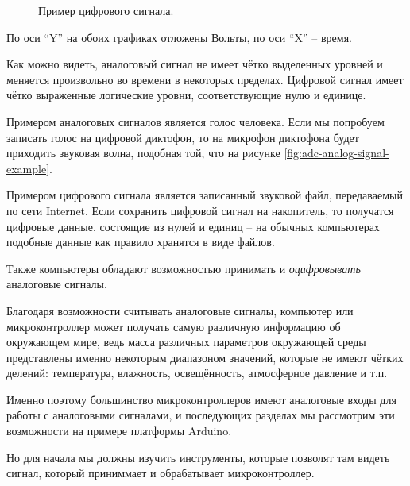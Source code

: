 \documentclass[a4paper,twoside]{book}
\begin{document}
\begin{figure}[ht]
  \caption{Пример цифрового сигнала.}
  \label{fig:adc-digital-signal-example}
\end{figure}

По оси ``Y'' на обоих графиках отложены Вольты, по оси ``X'' -- время.

Как можно видеть, аналоговый сигнал не имеет чётко выделенных уровней и меняется
произвольно во времени в некоторых пределах.  Цифровой сигнал имеет чётко
выраженные логические уровни, соответствующие нулю и единице.

Примером аналоговых сигналов является голос человека.  Если мы попробуем
записать голос на цифровой диктофон, то на микрофон диктофона будет приходить
звуковая волна, подобная той, что на рисунке
\ref{fig:adc-analog-signal-example}.

Примером цифрового сигнала является записанный звуковой файл, передаваемый по
сети Internet.  Если сохранить цифровой сигнал на накопитель, то получатся
цифровые данные, состоящие из нулей и единиц -- на обычных компьютерах подобные
данные как правило хранятся в виде файлов.

Также компьютеры обладают возможностью принимать и \emph{оцифровывать}
аналоговые сигналы.

Благодаря возможности считывать аналоговые сигналы, компьютер или
микроконтроллер может получать самую различную информацию об окружающем мире,
ведь масса различных параметров окружающей среды представлены именно некоторым
диапазоном значений, которые не имеют чётких делений: температура, влажность,
освещённость, атмосферное давление и т.п.

Именно поэтому большинство микроконтроллеров имеют аналоговые входы для работы с
аналоговыми сигналами, и последующих разделах мы рассмотрим эти возможности на
примере платформы Arduino.

Но для начала мы должны изучить инструменты, которые позволят там видеть сигнал,
который приниммает и обрабатывает микроконтроллер.
\end{document}
